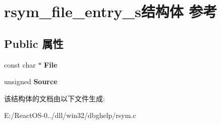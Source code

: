\hypertarget{structrsym__file__entry__s}{}\section{rsym\+\_\+file\+\_\+entry\+\_\+s结构体 参考}
\label{structrsym__file__entry__s}
\subsection*{Public 属性}
\begin{DoxyCompactItemize}
\item 
\mbox{\label{structrsym__file__entry__s_a323514707c475007f9df504878fa201f}} 
const char $\ast$ {\bfseries File}
\item 
\mbox{\label{structrsym__file__entry__s_a48addd7fb6846273f3fcf7e1a709b75d}} 
unsigned {\bfseries Source}
\end{DoxyCompactItemize}


该结构体的文档由以下文件生成\+:\begin{DoxyCompactItemize}
\item 
E\+:/\+React\+O\+S-\/0../dll/win32/dbghelp/rsym.\+c\end{DoxyCompactItemize}
